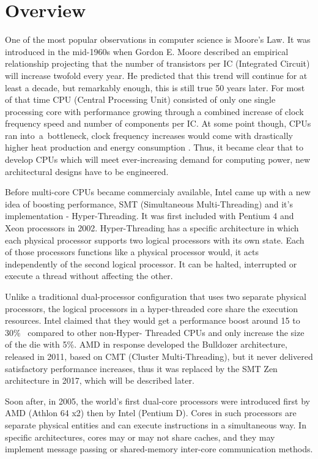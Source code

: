 \chapter{Overview}
One of the most popular observations in computer science is Moore's Law.
It was introduced in the mid-1960s when Gordon E. Moore described an empirical relationship \cite{Moore1965}
projecting that the number of transistors per IC (Integrated Circuit) will increase twofold every year.
He predicted that this trend will continue for at least a decade, but remarkably enough, this is still true 50 years later.
For most of that time CPU (Central Processing Unit) consisted of only one single processing core with performance growing through a combined increase of clock frequency speed and number of components per IC. At some point though, CPUs ran into~a~bottleneck, clock frequency increases would come with drastically higher heat production and energy consumption \cite{Illinois}. Thus, it became clear that to develop CPUs which will meet ever-increasing demand for computing power, new architectural designs have to be engineered.

Before multi-core CPUs became commercialy available, Intel came up with a new idea of boosting performance, SMT (Simultaneous Multi-Threading) and it's implementation - Hyper-Threading. It was first included with Pentium 4 and Xeon processors in 2002. Hyper-Threading has a specific architecture in which each physical processor supports two logical processors with its own state. Each of those processors functions like a physical processor would, it acts independently of the second logical processor. It can be halted, interrupted or execute a thread without affecting the other.

Unlike a traditional dual-processor configuration that uses two separate physical processors, the logical processors in a hyper-threaded core share the execution resources. Intel claimed that they would get a performance boost around 15 to 30\%~\cite{intel} compared to other non-Hyper-
Threaded CPUs and only increase the size of the die with 5\%. AMD in response developed the Bulldozer architecture, released in 2011, based on CMT (Cluster Multi-Threading), but it never delivered satisfactory performance increases, thus it was replaced by the SMT Zen architecture in 2017, which will be described later.

Soon after, in 2005, the world's first dual-core processors were introduced first by AMD (Athlon 64 x2) then by Intel (Pentium D). Cores in such processors are separate physical entities and can execute instructions in a simultaneous way. In specific architectures, cores may or may not share caches, and they may implement message passing or shared-memory inter-core communication methods. 

